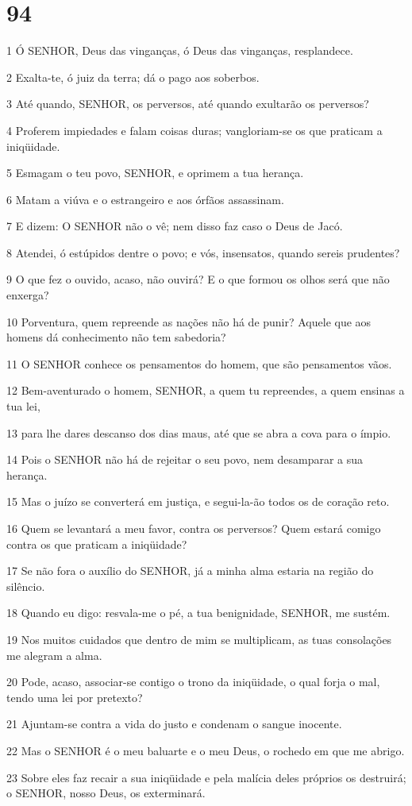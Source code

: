 \chapter{94}

\par 1 Ó SENHOR, Deus das vinganças, ó Deus das vinganças, resplandece.
\par 2 Exalta-te, ó juiz da terra; dá o pago aos soberbos.
\par 3 Até quando, SENHOR, os perversos, até quando exultarão os perversos?
\par 4 Proferem impiedades e falam coisas duras; vangloriam-se os que praticam a iniqüidade.
\par 5 Esmagam o teu povo, SENHOR, e oprimem a tua herança.
\par 6 Matam a viúva e o estrangeiro e aos órfãos assassinam.
\par 7 E dizem: O SENHOR não o vê; nem disso faz caso o Deus de Jacó.
\par 8 Atendei, ó estúpidos dentre o povo; e vós, insensatos, quando sereis prudentes?
\par 9 O que fez o ouvido, acaso, não ouvirá? E o que formou os olhos será que não enxerga?
\par 10 Porventura, quem repreende as nações não há de punir? Aquele que aos homens dá conhecimento não tem sabedoria?
\par 11 O SENHOR conhece os pensamentos do homem, que são pensamentos vãos.
\par 12 Bem-aventurado o homem, SENHOR, a quem tu repreendes, a quem ensinas a tua lei,
\par 13 para lhe dares descanso dos dias maus, até que se abra a cova para o ímpio.
\par 14 Pois o SENHOR não há de rejeitar o seu povo, nem desamparar a sua herança.
\par 15 Mas o juízo se converterá em justiça, e segui-la-ão todos os de coração reto.
\par 16 Quem se levantará a meu favor, contra os perversos? Quem estará comigo contra os que praticam a iniqüidade?
\par 17 Se não fora o auxílio do SENHOR, já a minha alma estaria na região do silêncio.
\par 18 Quando eu digo: resvala-me o pé, a tua benignidade, SENHOR, me sustém.
\par 19 Nos muitos cuidados que dentro de mim se multiplicam, as tuas consolações me alegram a alma.
\par 20 Pode, acaso, associar-se contigo o trono da iniqüidade, o qual forja o mal, tendo uma lei por pretexto?
\par 21 Ajuntam-se contra a vida do justo e condenam o sangue inocente.
\par 22 Mas o SENHOR é o meu baluarte e o meu Deus, o rochedo em que me abrigo.
\par 23 Sobre eles faz recair a sua iniqüidade e pela malícia deles próprios os destruirá; o SENHOR, nosso Deus, os exterminará.

